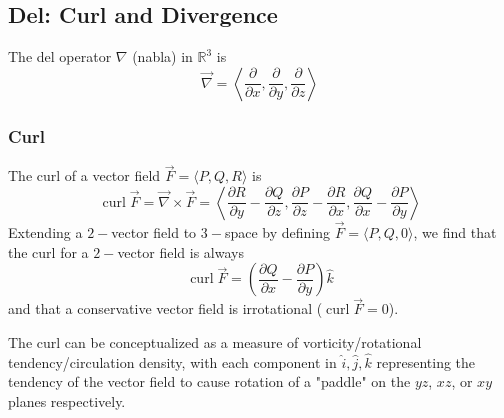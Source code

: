 \documentclass{article}
\DeclareMathOperator{\curl}{curl}
\newcommand{\vect}[1]{\ensuremath{\overrightarrow{#1}}}
\begin{document}
\subsection{Del: Curl and Divergence}
The del operator $\nabla$ (nabla) in $\mathbb{R}^3$  is
$$\vect{\nabla}=\left\langle \frac{\partial}{\partial x}, \frac{\partial}{\partial y}, \frac{\partial}{\partial z}\right\rangle$$

\subsubsection{Curl}
The curl of a vector field $\vect{F} = \langle P,Q,R \rangle$ is
$$\curl \vect{F} = \vect{\nabla}\times\vect{F}=\left\langle\frac{\partial R}{\partial y}-\frac{\partial Q}{\partial z},\frac{\partial P}{\partial z}-\frac{\partial R}{\partial x}, \frac{\partial Q}{\partial x}-\frac{\partial P}{\partial y}\right\rangle$$
Extending a $2-$vector field to $3-$space by defining $\vect{F}=\langle P, Q, 0 \rangle$, we find that the curl for a $2-$vector field is always
$$\curl \vect{F} = \left(\frac{\partial Q}{\partial x}-\frac{\partial P}{\partial y}\right)\hat{k}$$
and that a conservative vector field is irrotational ($\curl \vect{F} = 0$).

The curl can be conceptualized as a measure of vorticity/rotational tendency/circulation density, with each component in $\hat{i}, \hat{j}, \hat{k}$ representing the tendency of the vector field to cause rotation of a "paddle" on the $yz$, $xz$, or $xy$ planes respectively.
\end{document}
